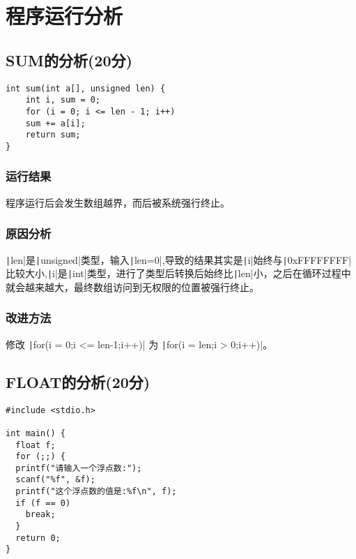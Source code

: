 \section{程序运行分析}
\subsection{SUM的分析(20分)}

\begin{verbatim}
int sum(int a[], unsigned len) {
    int i, sum = 0;
    for (i = 0; i <= len - 1; i++)
    sum += a[i];
    return sum;
}
\end{verbatim}

\subsubsection{运行结果}程序运行后会发生数组越界，而后被系统强行终止。

\subsubsection{原因分析}\texttt|len|是\texttt|unsigned|类型，输入\texttt|len=0|,导致的结果其实是\texttt|i|始终与\texttt|0xFFFFFFFF|比较大小,\texttt|i|是\texttt|int|类型，进行了类型后转换后始终比\texttt|len|小，之后在循环过程中就会越来越大，最终数组访问到无权限的位置被强行终止。

\subsubsection{改进方法}修改 \texttt|for(i = 0;i <= len-1;i++)| 为 \texttt|for(i = len;i > 0;i++)|。

\subsection{FLOAT的分析(20分)} 
\begin{verbatim}
#include <stdio.h>

int main() {
  float f;
  for (;;) {
  printf("请输入一个浮点数:");
  scanf("%f", &f);
  printf("这个浮点数的值是:%f\n", f);
  if (f == 0)
    break;
  }
  return 0;
}
\end{verbatim}

